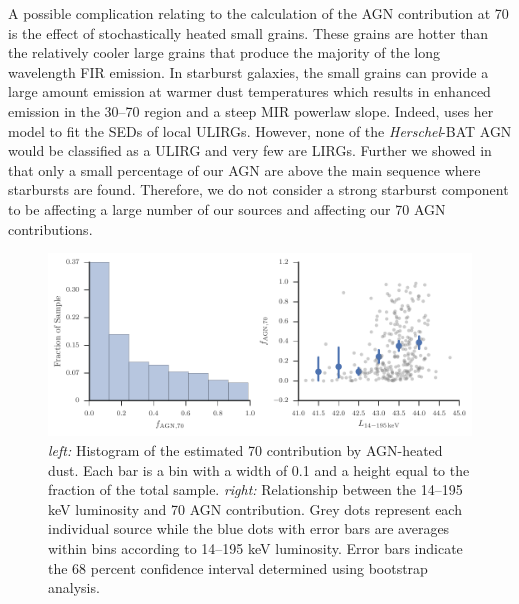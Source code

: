 \documentclass[fleqn, usenatbib]{mnras}
\newcommand{\herschel}{\emph{Herschel}}
\begin{document}
A possible complication relating to the calculation of the AGN contribution at 70 \micron{} is the effect of stochastically heated small grains. These grains are hotter than the relatively cooler large grains that produce the majority of the long wavelength FIR emission. In starburst galaxies, the small grains can provide a large amount emission at warmer dust temperatures which results in enhanced emission in the 30--70 \micron{} region and a steep MIR powerlaw slope. Indeed, \citet{Casey:2012jl} uses her model to fit the SEDs of local ULIRGs. However, none of the \herschel-BAT AGN would be classified as a ULIRG and very few are LIRGs. Further we showed in \citet{Shimizu:2015xo} that only a small percentage of our AGN are above the main sequence where starbursts are found. Therefore, we do not consider a strong starburst component to be affecting a large number of our sources and affecting our 70 \micron{} AGN contributions.
 

\begin{figure}
\includegraphics{figures/pacs_AGN_contribution}
\caption{\textit{left:} Histogram of the estimated 70 \micron{} contribution by AGN-heated dust. Each bar is a bin with a width of 0.1 and a height equal to the fraction of the total sample. \textit{right:} Relationship between the 14--195 keV luminosity and 70 \micron{} AGN contribution. Grey dots represent each individual source while the blue dots with error bars are averages within bins according to 14--195 keV luminosity. Error bars indicate the 68 percent confidence interval determined using bootstrap analysis.\label{fig:70um_agn_contribution}}
\end{figure}
\end{document}
